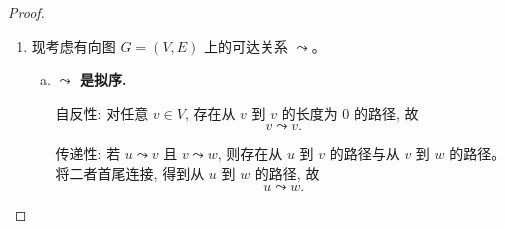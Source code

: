 \documentclass[a4paper, justified]{tufte-handout}
\begin{document}
\begin{proof}
\begin{enumerate}[(1)]
\begin{enumerate}[(a)]
          若 $x = 0$, 则由 $y \mid 0$ 与 $0 \mid y$ 可得 $y = 0$,
          故
          \[
            [0]_{\sim} = \set{0}.
          \]

          若 $x \neq 0$, 且 $x \sim y$, 则存在 $a, b \in \Z$ 使得
          \[
            y = ax,
            \qquad
            x = by.
          \]
          于是
          \[
            x = b(ax) = (ab)x.
          \]
          由于 $x \neq 0$, 得
          \[
            ab = 1.
          \]
          在整数中这只可能发生于
          \[
            a = b = 1
            \qquad \text{或} \qquad
            a = b = -1.
          \]
          故 $y = x$ 或 $y = -x$。

          反过来, 显然
          \[
            x \mid x,
            \qquad
            x \mid (-x),
            \qquad
            (-x) \mid x.
          \]
          故当 $x \neq 0$ 时,
          \[
            [x]_{\sim} = \set{x, -x}.
          \]

        \item \textbf{商集上的偏序关系.}

          映射
          \[
            \Phi : \Z/\sim \to \set{0} \cup \Z_{>0},
            \qquad
            \Phi([x]_{\sim}) = |x|
          \]
          是双射, 且
          \[
            [x]_{\sim} \le [y]_{\sim}
            \iff x \mid y
            \iff |x| \mid |y|.
          \]
          因而 $\Z/\sim$ 上的偏序, 就是把正负号压缩之后得到的 ``按绝对值整除'' 的偏序。

        \item \textbf{抽象的含义.}

          等价关系 $\sim$ 把只相差一个符号的整数识别为同一个对象:
          \[
            x \sim y \iff |x| = |y|.
          \]
          因而该抽象忘掉了 ``正负'', 只保留 ``大小的整除结构''。
      \end{enumerate}

    \item 现考虑有向图 $G = (V, E)$ 上的可达关系 $\leadsto$。

      \begin{enumerate}[(a)]
        \item \textbf{$\leadsto$ 是拟序.}

          自反性: 对任意 $v \in V$, 存在从 $v$ 到 $v$ 的长度为 $0$ 的路径,
          故
          \[
            v \leadsto v.
          \]

          传递性: 若 $u \leadsto v$ 且 $v \leadsto w$, 则存在从 $u$ 到 $v$ 的路径与从 $v$ 到 $w$ 的路径。将二者首尾连接, 得到从 $u$ 到 $w$ 的路径, 故
          \[
            u \leadsto w.
          \]


\end{enumerate}
\end{enumerate}
\end{proof}
\end{document}
